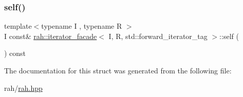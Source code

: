 \subsubsection{\texorpdfstring{self()}{self()}\hspace{0.1cm}{\footnotesize\ttfamily [2/2]}}
{\footnotesize\ttfamily template$<$typename I , typename R $>$ \\
I const\& \mbox{\hyperlink{structrah_1_1iterator__facade}{rah\+::iterator\+\_\+facade}}$<$ I, R, std\+::forward\+\_\+iterator\+\_\+tag $>$\+::self (\begin{DoxyParamCaption}{ }\end{DoxyParamCaption}) const\hspace{0.3cm}{\ttfamily [inline]}}



The documentation for this struct was generated from the following file\+:\begin{DoxyCompactItemize}
\item 
rah/\mbox{\hyperlink{rah_8hpp}{rah.\+hpp}}\end{DoxyCompactItemize}
